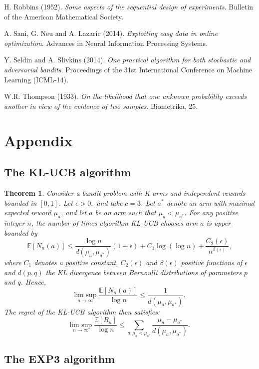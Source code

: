 \documentclass[10.5pt]{article}
\newtheorem{theorem}{Theorem}
\begin{document}
\begin{thebibliography}{1}
 H. Robbins (1952). {\em Some aspects of the sequential design of experiments}.  Bulletin of the American Mathematical Society.

 A. Sani, G. Neu and A. Lazaric (2014). {\em Exploiting easy data in online optimization}.  Advances in Neural Information Processing Systems.

 Y. Seldin and A. Slivkins (2014). {\em One practical algorithm for both stochastic and adversarial bandits}.  Proceedings of the 31st International Conference on Machine Learning (ICML-14).

 W.R. Thompson (1933). {\em On the likelihood that one unknown probability exceeds another in view of the evidence of two samples}. Biometrika, 25.

\end{thebibliography}

\pagebreak

\section*{Appendix}

\subsection*{The KL-UCB algorithm}
\begin{theorem}
Consider a bandit problem with K arms and independent rewards bounded in $[0, 1]$. Let $\epsilon > 0,$ and take $c = 3$. Let $a^*$ denote an arm with maximal expected reward $\mu_a$, and let $a$ be an arm such that $\mu_a < \mu_{a^*}$. For any positive integer $n$, the number of times algorithm KL-UCB chooses arm $a$ is upper-bounded by
$$ \mathbb{E}[N_{n}(a)] \leq \frac{\log n}{d(\mu_a, \mu_{a^*})}(1 + \epsilon) + C_1 \log(\log n) + \frac{C_2(\epsilon)}{n^{\beta(\epsilon)}},$$
where $C_1$ denotes a positive constant,  $C_2(\epsilon)$ and $\beta(\epsilon)$ positive functions of $\epsilon$ and $d(p,q)$ the KL divergence between Bernoulli distributions of parameters $p$ and $q$. Hence,
$$ \underset{n \rightarrow \infty}{\text{lim sup}} \; \frac{\mathbb{E}[N_{n}(a)]}{\log n} \leq \frac{1}{d(\mu_a, \mu_{a^*})}.$$
The regret of the KL-UCB algorithm then satisfies:
$$ \underset{n \rightarrow \infty}{\text{lim sup}} \; \frac{\mathbb{E}[R_n]}{\log n} \leq \sum_{a: \mu_a < \mu_{a^*}} \frac{\mu_a - \mu_{a^*}}{d(\mu_a, \mu_{a^*})}.$$
\end{theorem}

\subsection*{The EXP3 algorithm}
\end{document}
